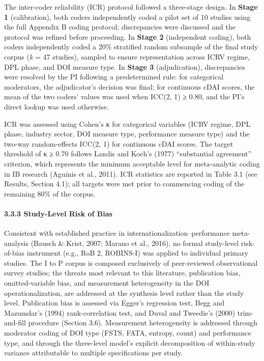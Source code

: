 \documentclass[
  12pt,a4paper]{article}
\begin{document}
The inter-coder reliability (ICR) protocol followed a three-stage
design. In \textbf{Stage 1} (calibration), both coders independently
coded a pilot set of 10 studies using the full Appendix B coding
protocol; discrepancies were discussed and the protocol was refined
before proceeding. In \textbf{Stage 2} (independent coding), both coders
independently coded a 20\% stratified random subsample of the final
study corpus (\emph{k} = 47 studies), sampled to ensure representation
across ICRV regime, DPL phase, and DOI measure type. In \textbf{Stage 3}
(adjudication), discrepancies were resolved by the PI following a
predetermined rule: for categorical moderators, the adjudicator's
decision was final; for continuous cDAI scores, the mean of the two
coders' values was used when ICC(2, 1) ≥ 0.80, and the PI's direct
lookup was used otherwise.

ICR was assessed using Cohen's κ for categorical variables (ICRV regime,
DPL phase, industry sector, DOI measure type, performance measure type)
and the two-way random-effects ICC(2, 1) for continuous cDAI scores. The
target threshold of κ ≥ 0.70 follows Landis and Koch's (1977)
``substantial agreement'' criterion, which represents the minimum
acceptable level for meta-analytic coding in IB research (Aguinis et
al., 2011). ICR statistics are reported in Table 3.1 (see Results,
Section 4.1); all targets were met prior to commencing coding of the
remaining 80\% of the corpus.

\hypertarget{study-level-risk-of-bias}{%
\paragraph{3.3.3 Study-Level Risk of
Bias}\label{study-level-risk-of-bias}}

Consistent with established practice in
internationalization--performance meta-analysis (Bausch \& Krist, 2007;
Marano et al., 2016), no formal study-level risk-of-bias instrument
(e.g., RoB 2, ROBINS-I) was applied to individual primary studies. The I
to P corpus is composed exclusively of peer-reviewed observational
survey studies; the threats most relevant to this literature,
publication bias, omitted-variable bias, and measurement heterogeneity
in the DOI operationalization, are addressed at the synthesis level
rather than the study level. Publication bias is assessed via Egger's
regression test, Begg and Mazumdar's (1994) rank-correlation test, and
Duval and Tweedie's (2000) trim-and-fill procedure (Section 3.6).
Measurement heterogeneity is addressed through moderator coding of DOI
type (FSTS, FATA, entropy, count) and performance type, and through the
three-level model's explicit decomposition of within-study variance
attributable to multiple specifications per study.
\end{document}
